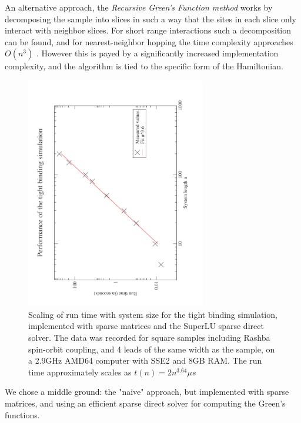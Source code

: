 An alternative approach, the \emph{Recursive Green's Function method} works by
decomposing the sample into slices in such a way that the sites in each slice
only interact with neighbor slices. For short range interactions such a
decomposition can be found, and for nearest-neighbor hopping the time
complexity approaches $O(n^3)$ \cite{rgfschmelcher}. However this is payed by
a significantly increased implementation complexity, and the algorithm is tied
to the specific form of the Hamiltonian.

\begin{figure}
    \begin{center}
    \includegraphics[angle=270,width=0.7\textwidth]{scaling.pdf}
    \end{center}
    \caption{Scaling of run time with system size for the tight binding
        simulation, implemented with sparse matrices and the SuperLU sparse
        direct solver. The data was recorded for square samples including
        Rashba spin-orbit coupling, and 4 leads of the same width as the
        sample, on a 2.9GHz AMD64 computer with SSE2 and 8GB RAM.
        The run time approximately scales as $t(n) = 2
        n^{3.64}\mu s$}
        \label{fig:scaling}
\end{figure}

We chose a middle ground: the "naive" approach, but implemented with sparse
matrices, and using an efficient sparse direct solver\cite{superlu99} for
computing the Green's functions.

